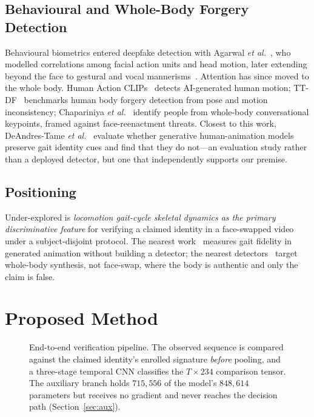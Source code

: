\documentclass[conference]{IEEEtran}
\begin{document}
\subsection{Behavioural and Whole-Body Forgery Detection}

Behavioural biometrics entered deepfake detection with Agarwal
\emph{et al.}~\cite{agarwal2019}, who modelled correlations among facial action
units and head motion, later extending beyond the face to gestural and vocal
mannerisms~\cite{agarwal_pnas}. Attention has since moved to the whole
body. Human Action CLIPs~\cite{humanactionclips} detects AI-generated human
motion; TT-DF~\cite{ttdf} benchmarks human body forgery detection from pose and
motion inconsistency; Chapariniya \emph{et al.}~\cite{convkeypoints} identify
people from whole-body conversational keypoints, framed against
face-reenactment threats. Closest to this work, DeAndres-Tame
\emph{et al.}~\cite{gaitfidelity} evaluate whether generative human-animation
models preserve gait identity cues and find that they do not---an evaluation
study rather than a deployed detector, but one that independently supports our
premise.

\subsection{Positioning}

Under-explored is \emph{locomotion gait-cycle skeletal dynamics as the primary discriminative feature} for verifying a claimed identity in a face-swapped video under a subject-disjoint protocol. The nearest work~\cite{gaitfidelity} measures gait fidelity in generated animation without building a detector; the nearest detectors~\cite{ttdf,humanactionclips} target whole-body synthesis, not face-swap, where the body is authentic and only the claim is false.

\section{Proposed Method}
\label{sec:method}

\begin{figure}[!t]
\centering

\caption{End-to-end verification pipeline. The observed sequence is compared
against the claimed identity's enrolled signature \emph{before} pooling, and a
three-stage temporal CNN classifies the $T\times234$ comparison tensor. The
auxiliary branch holds $715{,}556$ of the model's $848{,}614$ parameters but
receives no gradient and never reaches the decision path
(Section~\ref{sec:aux}).}
\label{fig:arch}
\end{figure}
\end{document}
